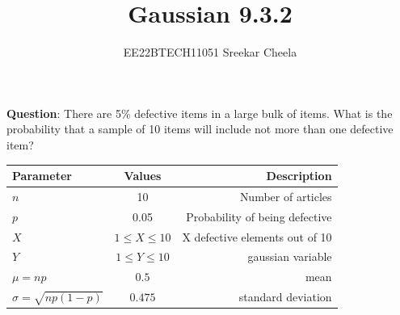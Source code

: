 \documentclass[journal,12pt,twocolumn]{IEEEtran}
\theoremstyle{remark}
\begin{document}

\vspace{3cm}

\title{Gaussian 9.3.2}
\author{EE22BTECH11051 Sreekar Cheela}
\maketitle
\newpage
\bigskip
\renewcommand{\thefigure}{\theenumi}
\renewcommand{\thetable}{\theenumi}

\textbf{Question}: There are 5\% defective items in a large bulk of items. What is the probability that a sample of 10 items will include not more than one defective item?\\
\solution 
\begin{table}[h!]
 \begin{center}
    \begin{tabular}{|l|c|r|}
    \hline
    Parameter & Values & Description\\
    \hline
    $n$ & 10 & Number of articles\\
    \hline
    $p$ & 0.05 & Probability of being defective\\
    \hline
    $X$ & $1\leq X \leq 10$
    & X defective elements out of 10\\
    \hline
    $Y$ & $1\leq Y \leq 10$
    & gaussian variable\\
    \hline
    $\mu=np$ & $0.5$ & mean\\
    \hline
    $\sigma=\sqrt{np(1-p)}$ & $0.475$ & standard deviation\\
    \hline
    \end{tabular}
    \end{center}
  \label{table:/9/3/2} 
\end{table}
\end{document}
